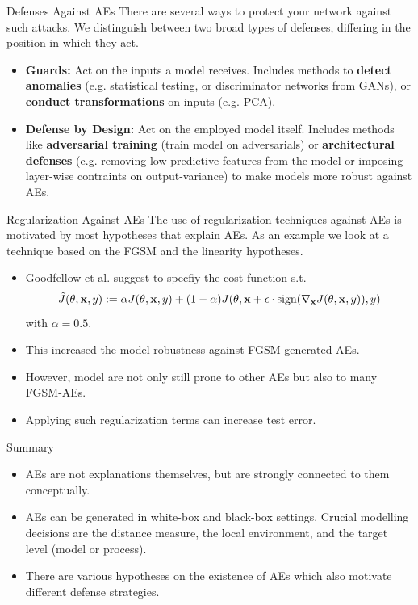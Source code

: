 \documentclass[11pt,compress,t,notes=noshow, xcolor=table]{beamer}
\begin{document}
\begin{vbframe}{Defenses Against AEs}
There are several ways to protect your network against such attacks. We distinguish between two broad types of defenses, differing in the position in which they act.
\begin{itemize}
    \item \textbf{Guards:} Act on the inputs a model receives. Includes methods to \textbf{detect anomalies} (e.g. statistical testing, or discriminator networks from GANs), or \textbf{conduct transformations} on inputs (e.g. PCA).
    \item \textbf{Defense by Design:} Act on the employed model itself. Includes methods like \textbf{adversarial training} (train model on adversarials) or \textbf{architectural defenses} (e.g. removing low-predictive features from the model or imposing layer-wise contraints on output-variance) to make models more robust against AEs.
\end{itemize}
\end{vbframe}

\begin{vbframe}{Regularization Against AEs}
The use of regularization techniques against AEs is motivated by most hypotheses that explain AEs. As an example we look at a technique based on the FGSM and the linearity hypotheses.
\begin{itemize}
    \item Goodfellow et al. suggest to specfiy the cost function s.t.
    \begin{equation*}
        \tilde{J}(\theta,\xv,y):=\alpha J(\theta,\xv,y)+(1-\alpha) J(\theta,\xv+\epsilon\cdot\text{sign}(\nabla_{\xv} J(\theta,\xv,y)),y)
    \end{equation*}
    with $\alpha=0.5$.
    \item This increased the model robustness against FGSM generated AEs.
    \item However, model are not only still prone to other AEs but also to many FGSM-AEs.
    \item Applying such regularization terms can increase test error.
\end{itemize}
\end{vbframe}

\begin{vbframe}{Summary}
\begin{itemize}
    \item AEs are not explanations themselves, but are strongly connected to them conceptually.
    \item AEs can be generated in white-box and black-box settings. Crucial modelling decisions are the distance measure, the local environment, and the target level (model or process).
    \item There are various hypotheses on the existence of AEs which also motivate different defense strategies.
\end{itemize}
\end{vbframe}
\end{document}
